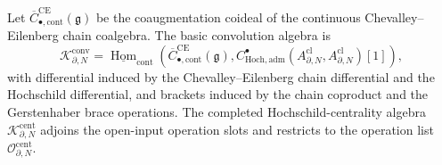 \documentclass[11pt]{memoir}
\begin{document}
\begin{defn}\label{defn:admissible-hochschild-centre-lift}
  Let \(\overline C^{\mathrm{CE}}_{\bullet,\mathrm{cont}}(\mathfrak g)\)
  be the coaugmentation coideal of the continuous
  Chevalley--Eilenberg chain coalgebra.  The basic convolution algebra is
  \[
    \mathcal K^{\mathrm{conv}}_{\partial,N}
    =\underline{\operatorname{Hom}}_{\mathrm{cont}}
      \!\left(
        \overline C^{\mathrm{CE}}_{\bullet,\mathrm{cont}}(\mathfrak g),
        C^\bullet_{\mathrm{Hoch},\mathrm{adm}}
        (A^{\mathrm{cl}}_{\partial,N},A^{\mathrm{cl}}_{\partial,N})[1]
      \right),
  \]
  with differential induced by the Chevalley--Eilenberg chain
  differential and the Hochschild differential, and brackets induced by
  the chain coproduct and the Gerstenhaber brace operations.  The
  completed Hochschild-centrality algebra
  \(\mathcal K^{\mathrm{cent}}_{\partial,N}\) adjoins the open-input
  operation slots and restricts to the operation list
  \(\mathcal O^{\mathrm{cent}}_{\partial,N}\).


\end{defn}
\end{document}
